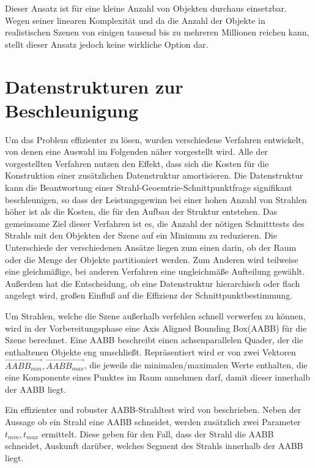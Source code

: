 
Dieser Ansatz ist für eine kleine Anzahl von Objekten durchaus einsetzbar. Wegen seiner linearen Komplexität und da die Anzahl der Objekte in realistischen Szenen von einigen tausend bis zu mehreren Millionen reichen kann, stellt dieser Ansatz jedoch keine wirkliche Option dar.

\chapter{Datenstrukturen zur Beschleunigung}
\label{sec:introstructs}
Um das Problem effizienter zu lösen, wurden verschiedene Verfahren entwickelt, von denen eine Auswahl im Folgenden näher vorgestellt wird. Alle der vorgestellten Verfahren nutzen den Effekt, dass sich die Kosten für die Konstruktion einer zusätzlichen Datenstruktur amortisieren. Die Datenstruktur kann die Beantwortung einer Strahl-Geoemtrie-Schnittpunktfrage signifikant beschleunigen, so dass der Leistungsgewinn bei einer hohen Anzahl von Strahlen höher ist als die Kosten, die für den Aufbau der Struktur entstehen.
Das gemeinsame Ziel dieser Verfahren ist es, die Anzahl der nötigen Schnitttests des Strahls mit den Objekten der Szene auf ein Minimum zu reduzieren.
Die Unterschiede der verschiedenen Ansätze liegen zum einen darin, ob der Raum oder die Menge der Objekte partitioniert werden. Zum Anderen wird teilweise eine gleichmäßige, bei anderen Verfahren eine ungleichmäße Aufteilung gewählt. Außerdem hat die Entscheidung, ob eine Datenstruktur hierarchisch oder flach angelegt wird, großen Einfluß auf die Effizienz der Schnittpunktbestimmung.

Um Strahlen, welche die Szene außerhalb verfehlen schnell verwerfen zu können, wird in der Vorbereitungsphase eine Axis Aligned Bounding Box(AABB) für die Szene berechnet. Eine AABB beschreibt einen achsenparallelen Quader, der die enthaltenen Objekte eng umschließt. Repräsentiert wird er von zwei Vektoren $\vec{AABB_{min}}, \vec{AABB_{max}}$, die jeweils die minimalen/maximalen Werte enthalten, die eine Komponente eines Punktes im Raum annehmen darf, damit dieser innerhalb der AABB liegt.

Ein effizienter und robuster AABB-Strahltest wird von \cite{Williams05} beschrieben. Neben der Aussage ob ein Strahl eine AABB schneidet, werden zusätzlich zwei Parameter $t_{min}, t_{max}$ ermittelt. Diese geben für den Fall, dass der Strahl die AABB schneidet, Auskunft darüber, welches Segment des Strahls innerhalb der AABB liegt.

